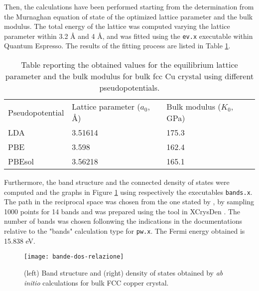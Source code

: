 \documentclass[
	12pt, %
]{fphw}
\begin{document}
Then, the calculations have been performed starting from the determination from the Murnaghan equation of state of the optimized lattice parameter and the bulk modulus.
The total energy of the lattice was computed varying the lattice parameter within 3.2 \r{A} and 4 \r{A}, and was fitted using the \texttt{ev.x} executable within Quantum Espresso.
The results of the fitting process are listed in Table \ref{Murn}.
\\
\begin{table} [h!]
	\centering
	\begin{tabular}{lll}
		\cline{1-2}
		Pseudopotential	&Lattice parameter ($ a_{0}$, \r{A}) & Bulk modulus ($ K_{0}$, GPa) \\
		LDA				&3.51614						&175.3\\
		PBE				&3.598							&162.4\\
		PBEsol			&3.56218						&165.1\\
		 \cline{1-2}
	\end{tabular}
	\caption{Table reporting the obtained values for the equilibrium lattice parameter and the bulk modulus for bulk fcc Cu crystal using different pseudopotentials.}
	\label{Murn}
\end{table}
Furthermore, the band structure and the connected density of states were computed and the graphs in Figure \ref{bande} using respectively the executables \texttt{bands.x}. 
The path in the reciprocal space was chosen from the one stated by \citet{setyawan_high-throughput_2010}, by sampling 1000 points for 14 bands and was prepared using the tool in XCrysDen \cite{kokalj_xcrysdennew_1999}. 
The number of bands was chosen follonwing the indications in the documentations relative to the "bands" calculation type for \texttt{pw.x}. 
The Fermi energy obtained is 15.838 eV.
\begin{figure}
	\centering
	\texttt{[image: bande-dos-relazione]}
	\caption{(left) Band structure and (right) density of states obtained by \textit{ab initio} calculations for bulk FCC copper crystal.}
	\label{bande}
\end{figure}

\end{document}
